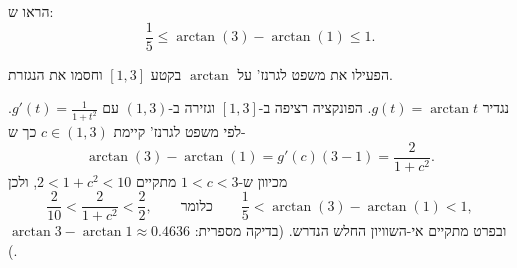 
\begin{question}
הראו ש:
\[ \frac15\le \arctan(3)-\arctan(1)\le 1. \]
\end{question}

\begin{hint}
הפעילו את משפט לגרנז' על $\arctan$ בקטע $[1,3]$ וחסמו את הנגזרת.
\end{hint}

\begin{solution}
נגדיר $g(t)=\arctan t$. הפונקציה רציפה ב-$[1,3]$ וגזירה ב-$(1,3)$ עם $g'(t)=\frac{1}{1+t^2}$. לפי משפט לגרנז' קיימת $c\in(1,3)$ כך ש-
\[ \arctan(3)-\arctan(1)=g'(c)(3-1)=\frac{2}{1+c^2}. \]
מכיוון ש-$1<c<3$ מתקיים $2<1+c^2<10$, ולכן
\[ \frac{2}{10}<\frac{2}{1+c^2}<\frac{2}{2}, \qquad\text{כלומר}\qquad \frac15<\arctan(3)-\arctan(1)<1, \]
ובפרט מתקיים אי-השוויון החלש הנדרש. (בדיקה מספרית: $\arctan 3-\arctan 1\approx 0.4636$.)
\end{solution}
